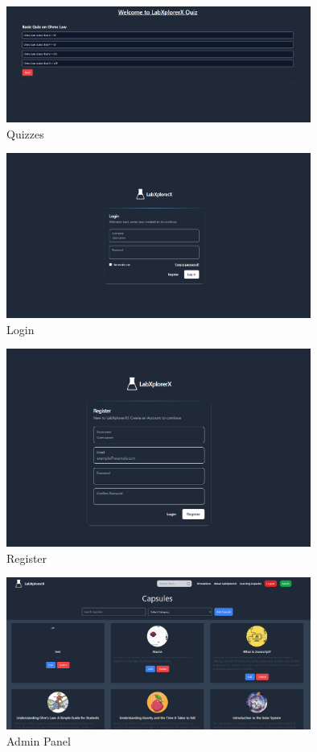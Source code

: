  \begin{figure}[H]
    \centering
     \includegraphics[width = 10cm]{Diagrams/output/quiz.png}
     \caption{Quizzes}
 \end{figure}

 \begin{figure}[H]
    \centering
     \includegraphics[width = 10cm]{Diagrams/output/login.png}
     \caption{Login}
 \end{figure}

 \begin{figure}[H]
    \centering
     \includegraphics[width = 10cm]{Diagrams/output//register.png}
     \caption{Register}
 \end{figure}

 \begin{figure}[H]
    \centering
     \includegraphics[width = 10cm]{Diagrams/output/admin.png}
     \caption{Admin Panel}
 \end{figure}

